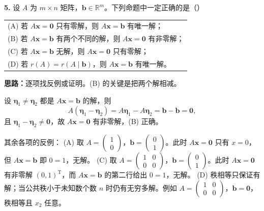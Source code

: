 \else \answerarea[10] \fi%

\textbf{5.} 设 \(A\) 为 \(m\times n\) 矩阵，\(\boldsymbol b\in\mathbb R^m\)。下列命题中一定正确的是（\quad）
\begin{center}
\begin{tabular}{l}
(A) 若 \(A\boldsymbol x=\boldsymbol 0\) 只有零解，则 \(A\boldsymbol x=\boldsymbol b\) 有唯一解；\\[3pt]
(B) 若 \(A\boldsymbol x=\boldsymbol b\) 有两个不同的解，则 \(A\boldsymbol x=\boldsymbol 0\) 有非零解；\\[3pt]
(C) 若 \(A\boldsymbol x=\boldsymbol b\) 无解，则 \(A\boldsymbol x=\boldsymbol 0\) 只有零解；\\[3pt]
(D) 若 \(r(A)=r(A\mid\boldsymbol b)\)，则 \(A\boldsymbol x=\boldsymbol b\) 有唯一解。
\end{tabular}
\end{center}

\ifshowsolutions%
\textbf{思路：}逐项找反例或证明。(B) 的关键是把两个解相减。

设 \(\boldsymbol\eta_1\neq\boldsymbol\eta_2\) 都是 \(A\boldsymbol x=\boldsymbol b\) 的解，则
\[
A(\boldsymbol\eta_1-\boldsymbol\eta_2)=A\boldsymbol\eta_1-A\boldsymbol\eta_2=\boldsymbol b-\boldsymbol b=\boldsymbol 0,
\]
且 \(\boldsymbol\eta_1-\boldsymbol\eta_2\neq\boldsymbol 0\)，故 \(A\boldsymbol x=\boldsymbol 0\) 有非零解，(B) 正确。

其余各项的反例：
(A) 取 \(A=\begin{pmatrix}1\\0\end{pmatrix}\)，\(\boldsymbol b=\begin{pmatrix}0\\1\end{pmatrix}\)。此时 \(A\boldsymbol x=\boldsymbol 0\) 只有 \(x=0\)，但 \(A\boldsymbol x=\boldsymbol b\) 即 \(0=1\)，无解。
(C) 取 \(A=\begin{pmatrix}1&0\\0&0\end{pmatrix}\)，\(\boldsymbol b=\begin{pmatrix}0\\1\end{pmatrix}\)。此时 \(A\boldsymbol x=\boldsymbol 0\) 有非零解 \((0,1)^{\mathrm T}\)，而 \(A\boldsymbol x=\boldsymbol b\) 的第二行给出 \(0=1\)，无解。
(D) 秩相等只保证有解；当公共秩小于未知数个数 \(n\) 时仍有无穷多解。例如 \(A=\begin{pmatrix}1&0\\0&0\end{pmatrix}\)，\(\boldsymbol b=\boldsymbol 0\)，秩相等且 \(x_2\) 任意。

